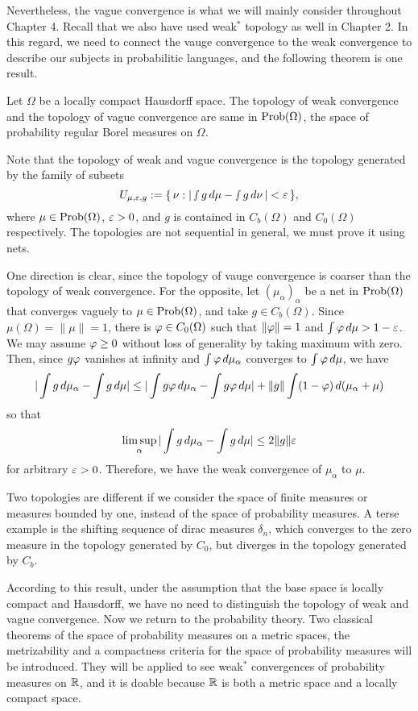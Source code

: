 \documentclass[a4paper]{article}
\begin{document}
Nevertheless, the vague convergence is what we will mainly consider throughout Chapter 4.
Recall that we also have used weak$^*$ topology as well in Chapter 2.
In this regard, we need to connect the vauge convergence to the weak convergence to describe our subjects in probabilitic languages, and the following theorem is one result.

\begin{thm}
Let $\Omega$ be a locally compact Hausdorff space.
The topology of weak convergence and the topology of vague convergence are same in $\operatorname{Prob}(\Omega)$, the space of probability regular Borel measures on $\Omega$.
\end{thm}

Note that the topology of weak and vague convergence is the topology generated by the family of subsets
\[U_{\mu,\varepsilon,g}:=\{\,\nu:|\smallint g\,d\mu-\smallint g\,d\nu\,|<\varepsilon\,\},\]
where $\mu\in\operatorname{Prob}(\Omega)$, $\varepsilon>0$, and $g$ is contained in $C_b(\Omega)$ and $C_0(\Omega)$ respectively.
The topologies are not sequential in general, we must prove it using nets.

\begin{pf}
One direction is clear, since the topology of vauge convergence is coarser than the topology of weak convergence.
For the opposite, let $(\mu_\alpha)_\alpha$ be a net in $\operatorname{Prob}(\Omega)$ that converges vaguely to $\mu\in\operatorname{Prob}(\Omega)$, and take $g\in C_b(\Omega)$.
Since $\mu(\Omega)=\|\mu\|=1$, there is $\varphi\in C_0(\Omega)$ such that $\|\varphi\|=1$ and $\int\varphi\,d\mu>1-\varepsilon$.
We may assume $\varphi\ge0$ without loss of generality by taking maximum with zero.
Then, since $g\varphi$ vanishes at infinity and $\int\varphi\,d\mu_\alpha$ converges to $\int\varphi\,d\mu$, we have
\[|\int g\,d\mu_\alpha-\int g\,d\mu|\le|\int g\varphi\,d\mu_\alpha-\int g\varphi\,d\mu|+\|g\|\int(1-\varphi)\,d(\mu_\alpha+\mu)\]
so that
\[\limsup_\alpha|\int g\,d\mu_\alpha-\int g\,d\mu|\le2\|g\|\varepsilon\]
for arbitrary $\varepsilon>0$.
Therefore, we have the weak convergence of $\mu_\alpha$ to $\mu$.
\end{pf}
\begin{ex}
Two topologies are different if we consider the space of finite measures or measures bounded by one, instead of the space of probability measures.
A terse example is the shifting sequence of dirac measures $\delta_n$, which converges to the zero measure in the topology generated by $C_0$, but diverges in the topology generated by $C_b$.
\end{ex}

According to this result, under the assumption that the base space is locally compact and Hausdorff, we have no need to distinguish the topology of weak and vague convergence.
Now we return to the probability theory.
Two classical theorems of the space of probability measures on a metric spaces, the metrizability and a compactness criteria for the space of probability measures will be introduced.
They will be applied to see weak$^*$ convergences of probability measures on $\mathbb{R}$, and it is doable because $\mathbb{R}$ is both a metric space and a locally compact space.
\end{document}
